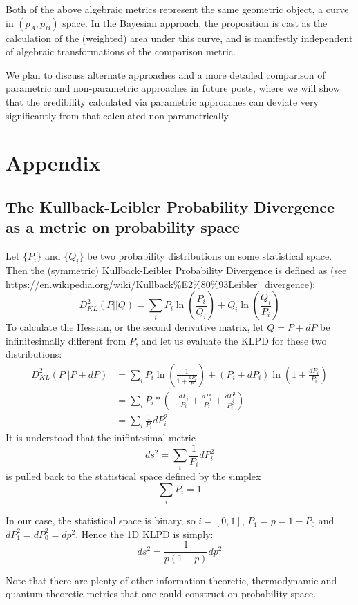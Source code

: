 \documentclass[12pt]{report}
\newcommand{\beq}{\begin{equation}} %
\newcommand{\eeq}{\end{equation}} %
\begin{document}
Both of the above algebraic metrics represent the same geometric object,
a curve in \((p_A, p_B)\) space. In the Bayesian approach, the proposition is
cast as the calculation of
the (weighted) area under this curve, and is manifestly independent of
algebraic transformations of the comparison metric.

We plan to discuss alternate approaches and a more
detailed comparison of parametric and non-parametric approaches in
future posts, where we will show that the credibility calculated via parametric approaches
can deviate very significantly from that calculated non-parametrically.

\section{Appendix}
\subsection{The Kullback-Leibler Probability Divergence as a metric on probability space}
Let \(\{P_i\}\) and \(\{Q_i\}\) be two probability distributions on some statistical space. Then the (symmetric) Kullback-Leibler Probability Divergence is defined as (see \url{https://en.wikipedia.org/wiki/Kullback\%E2\%80\%93Leibler_divergence}):
\beq\label{eq:klpd}
D^2_{KL}(P||Q)=\sum_i P_i\ln\left(\frac{P_i}{Q_i}\right) + Q_i\ln\left(\frac{Q_i}{P_i}\right)
\eeq
To calculate the Hessian, or the second derivative matrix, let \(Q=P+dP\) be infinitesimally different from \(P\), and let us evaluate the KLPD for these two distributions:
\beq
\begin{split}
  D^2_{KL}(P||P+dP) &= \sum_i P_i\ln\left(\frac{1}{1+\frac{dP_i}{P_i}}\right) + (P_i+dP_i)\ln\left(1+\frac{dP_i}{P_i}\right)\\
  &= \sum_iP_i*\left(-\frac{dP_i}{P_i}+\frac{dP_i}{P_i}+\frac{dP_i^2}{P^2_i}\right)\\
  &=\sum_i\frac{1}{P_i}dP_i^2
\end{split}
\eeq
It is understood that the inifintesimal metric 
\beq
ds^2 = \sum_i\frac{1}{P_i}dP_i^2
\eeq
is pulled back to the statistical space defined by the simplex
\beq
\sum_iP_i = 1
\eeq

In our case, the statistical space is binary, so \(i=[0,1]\), \(P_1 = p=1-P_0\) and \(dP_1^2 = dP_0^2 =dp^2\). Hence the 1D KLPD is simply:
\beq
ds^2 = \frac{1}{p(1-p)}dp^2
\eeq

Note that there are plenty of other information theoretic,
thermodynamic and quantum theoretic metrics that one could construct
on probability space.
\end{document}
